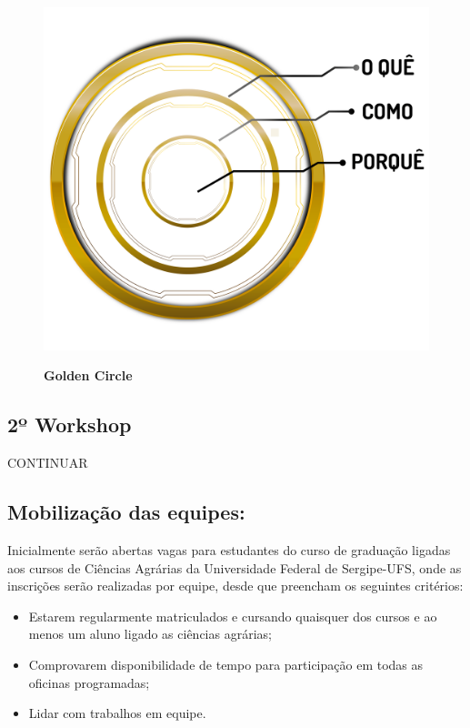 \begin{figure}[h!]
\centering
\caption{\textbf{Golden Circle}}
\includegraphics[scale=0.05]{Imagens/circulo_dourado.png}
\label{figura_2}
\end{figure}

\newpage


\subsection{2º Workshop}

CONTINUAR

\subsection{Mobilização das equipes:}

Inicialmente serão abertas vagas para estudantes do curso de graduação ligadas aos cursos de Ciências Agrárias da Universidade Federal de Sergipe-UFS, onde as inscrições serão realizadas por equipe, desde que preencham os seguintes critérios:

	
\begin{itemize}
\item{Estarem regularmente matriculados e cursando quaisquer dos cursos e ao menos um aluno ligado as ciências agrárias;}
\item{Comprovarem disponibilidade de tempo para participação em todas as oficinas programadas;}
\item{Lidar com trabalhos em equipe.}
\end{itemize}

